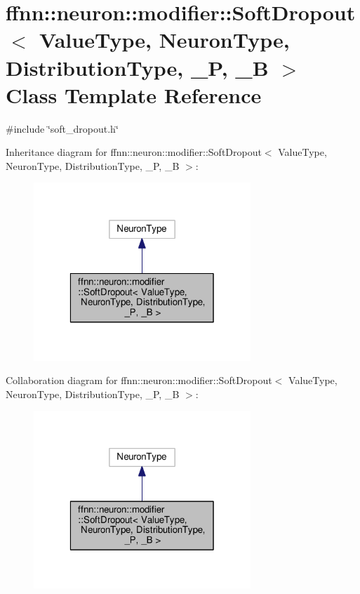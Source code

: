 \hypertarget{classffnn_1_1neuron_1_1modifier_1_1_soft_dropout}{\section{ffnn\-:\-:neuron\-:\-:modifier\-:\-:Soft\-Dropout$<$ Value\-Type, Neuron\-Type, Distribution\-Type, \-\_\-\-P, \-\_\-\-B $>$ Class Template Reference}
\label{classffnn_1_1neuron_1_1modifier_1_1_soft_dropout}
}


{\ttfamily \#include \char`\"{}soft\-\_\-dropout.\-h\char`\"{}}



Inheritance diagram for ffnn\-:\-:neuron\-:\-:modifier\-:\-:Soft\-Dropout$<$ Value\-Type, Neuron\-Type, Distribution\-Type, \-\_\-\-P, \-\_\-\-B $>$\-:\nopagebreak
\begin{figure}[H]
\begin{center}
\leavevmode
\includegraphics[width=232pt]{classffnn_1_1neuron_1_1modifier_1_1_soft_dropout__inherit__graph}
\end{center}
\end{figure}


Collaboration diagram for ffnn\-:\-:neuron\-:\-:modifier\-:\-:Soft\-Dropout$<$ Value\-Type, Neuron\-Type, Distribution\-Type, \-\_\-\-P, \-\_\-\-B $>$\-:\nopagebreak
\begin{figure}[H]
\begin{center}
\leavevmode
\includegraphics[width=232pt]{classffnn_1_1neuron_1_1modifier_1_1_soft_dropout__coll__graph}
\end{center}
\end{figure}
